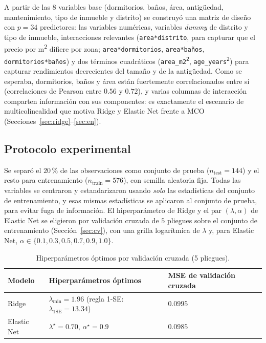 \documentclass[11pt,a4paper]{article}
\theoremstyle{simple}
\begin{document}
A partir de las $8$ variables base (dormitorios, baños, área, antigüedad, mantenimiento, tipo de inmueble y distrito) se construyó una matriz de diseño con $p=34$ predictores: las variables numéricas, variables \textit{dummy} de distrito y tipo de inmueble, interacciones relevantes (\texttt{area*distrito}, para capturar que el precio por m\textsuperscript{2} difiere por zona; \texttt{area*dormitorios}, \texttt{area*baños}, \texttt{dormitorios*baños}) y dos términos cuadráticos (\texttt{area\_m2\textsuperscript{2}}, \texttt{age\_years\textsuperscript{2}}) para capturar rendimientos decrecientes del tamaño y de la antigüedad. Como se esperaba, dormitorios, baños y área están fuertemente correlacionados entre sí (correlaciones de Pearson entre $0.56$ y $0.72$), y varias columnas de interacción comparten información con sus componentes: es exactamente el escenario de multicolinealidad que motiva Ridge y Elastic Net frente a MCO (Secciones~\ref{sec:ridge}--\ref{sec:en}).

\subsection{Protocolo experimental}
Se separó el $20\,\%$ de las observaciones como conjunto de prueba ($n_{\mathrm{test}}=144$) y el resto para entrenamiento ($n_{\mathrm{train}}=576$), con semilla aleatoria fija. Todas las variables se centraron y estandarizaron usando \emph{solo} las estadísticas del conjunto de entrenamiento, y esas mismas estadísticas se aplicaron al conjunto de prueba, para evitar fuga de información. El hiperparámetro de Ridge y el par $(\lambda,\alpha)$ de Elastic Net se eligieron por validación cruzada de $5$ pliegues sobre el conjunto de entrenamiento (Sección~\ref{sec:cv}), con una grilla logarítmica de $\lambda$ y, para Elastic Net, $\alpha\in\{0.1,0.3,0.5,0.7,0.9,1.0\}$.

\begin{table}[H]
\centering
\caption{Hiperparámetros óptimos por validación cruzada (5 pliegues).}\label{tab:hiper-opt}
\small
\begin{tabular}{@{}lll@{}}
\toprule
\textbf{Modelo} & \textbf{Hiperparámetros óptimos} & \textbf{MSE de validación cruzada}\\
\midrule
Ridge & $\lambda_{\min}=1.96$ (regla 1-SE: $\lambda_{1\text{SE}}=13.34$) & $0.0995$\\
Elastic Net & $\lambda^\star=0.70$, $\alpha^\star=0.9$ & $0.0985$\\
\bottomrule
\end{tabular}
\end{table}
\end{document}
